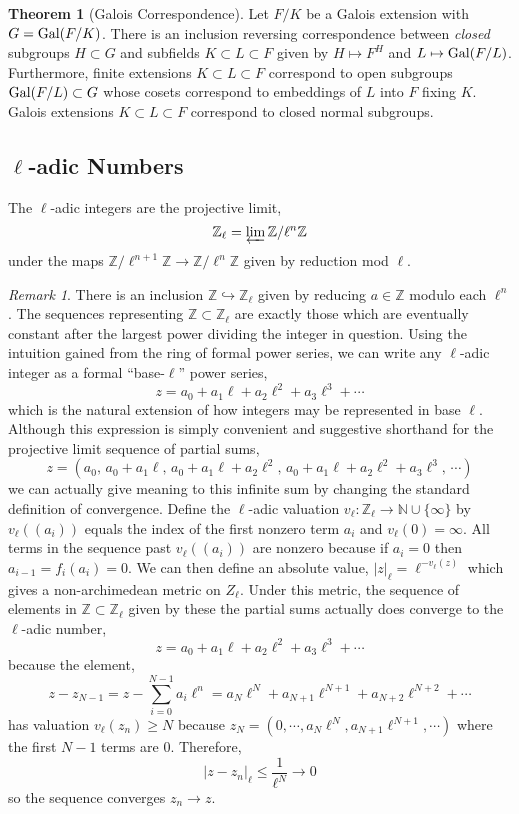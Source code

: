 \documentclass[12pt]{article}
\newcommand{\Z}{\mathbb{Z}}
\newcommand{\N}{\mathbb{N}}
\newcommand{\Gal}[1]{\mathrm{Gal} \small(#1 \small)}
\theoremstyle{remark}
\newtheorem*{remark}{Remark}
\theoremstyle{definition}
\newtheorem{theorem}{Theorem}[section]
\newenvironment{definition}[1][Definition:]{\begin{trivlist}
\item[\hskip \labelsep {\bfseries #1}]}{\end{trivlist}}
\begin{document}
\begin{theorem}[Galois Correspondence]
Let $F / K$ be a Galois extension with $G = \Gal{F / K}$. There is an inclusion reversing correspondence between \textit{closed} subgroups $H \subset G$ and subfields $K \subset L \subset F$ given by $H \mapsto F^H$ and $L \mapsto \Gal{F / L}$.
Furthermore, finite extensions $K \subset L \subset F$ correspond to open subgroups $\Gal{F / L} \subset G$ whose cosets correspond to embeddings of $L$ into $F$ fixing $K$. Galois extensions $K \subset L \subset F$ correspond to closed normal subgroups. 
\end{theorem}


\subsection{$\ell$-adic Numbers}

\begin{definition}
The $\ell$-adic integers are the projective limit,
\[ \Z_{\ell} = \varprojlim \Z / \ell^n \Z \]
under the maps $\Z / \ell^{n+1} \Z \to \Z / \ell^n \Z$ given by reduction mod $\ell$. 
\end{definition}

\begin{remark}
There is an inclusion $\Z \hookrightarrow \Z_{\ell}$ given by reducing $a \in \Z$ modulo each $\ell^n$. The sequences representing $\Z \subset \Z_{\ell}$ are exactly those which are eventually constant after the largest power dividing the integer in question. Using the intuition gained from the ring of formal power series, we can write any $\ell$-adic integer as a formal ``base-$\ell$'' power series,
\[ z = a_0 + a_1 \ell + a_2 \ell^2 + a_3 \ell^3 + \cdots \]
which is the natural extension of how integers may be represented in base $\ell$. 
Although this expression is simply convenient and suggestive shorthand for the projective limit sequence of partial sums,
\[ z = (a_0, \, a_0 + a_1 \ell, \, a_0 + a_1 \ell + a_2 \ell^2, \, a_0 + a_1 \ell + a_2 \ell^2 + a_3 \ell^3, \, \cdots) \] 
we can actually give meaning to this infinite sum by changing the standard definition of convergence. Define the $\ell$-adic valuation $v_{\ell} : \Z_{\ell} \to \N \cup \{ \infty \}$ by $v_{\ell}((a_i))$ equals the index of the first nonzero term $a_i$ and $v_{\ell}(0) = \infty$. All terms in the sequence past $v_{\ell}((a_i))$ are nonzero because if $a_i = 0$ then $a_{i-1} = f_i(a_i) = 0$. We can then define an absolute value, $|z|_{\ell} = \ell^{-v_{\ell}(z)}$ which gives a non-archimedean metric on $Z_{\ell}$. Under this metric, the sequence of elements in $\Z \subset \Z_{\ell}$ given by these the partial sums
actually does converge to the $\ell$-adic number,
\[ z = a_0 + a_1 \ell + a_2 \ell^2 + a_3 \ell^3 + \cdots \]
because the element,
\[ z - z_{N-1} = z - \sum_{i = 0}^{N-1} a_i \ell^n = a_N \ell^N + a_{N+1} \ell^{N+1} + a_{N+2} \ell^{N+2} + \cdots \]
has valuation $v_\ell(z_n) \ge N$ because $z_N = (0, \cdots, a_N \ell^N, a_{N+1} \ell^{N+1}, \cdots)$ where the first $N-1$ terms are $0$. Therefore, 
\[ |z - z_n|_{\ell} \le \frac{1}{\ell^N} \to 0 \]
so the sequence converges $z_n \to z$.
\end{remark}
\end{document}
